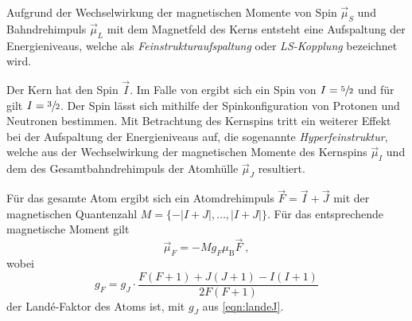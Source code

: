     Aufgrund der Wechselwirkung der magnetischen Momente von Spin $\vec{\mu}_S$ und Bahndrehimpuls $\vec{\mu}_L$ mit dem Magnetfeld des Kerns entsteht eine Aufspaltung der Energieniveaus,
    welche als \textit{Feinstrukturaufspaltung} oder \textit{LS-Kopplung} bezeichnet wird.

    Der Kern hat den Spin $\vec{I}$.
    Im Falle von  ergibt sich ein Spin von $I = \sfrac{5}{2}$ und für  gilt $I = \sfrac{3}{2}$.
    Der Spin lässt sich mithilfe der Spinkonfiguration von Protonen und Neutronen bestimmen.
    Mit Betrachtung des Kernspins tritt ein weiterer Effekt bei der Aufspaltung der Energieniveaus auf,
    die sogenannte \textit{Hyperfeinstruktur},
    welche aus der Wechselwirkung der magnetischen Momente des Kernspins $\vec{\mu}_I$ und dem des Gesamtbahndrehimpuls der Atomhülle $\vec{\mu}_J$ resultiert.

    Für das gesamte Atom ergibt sich ein Atomdrehimpuls $\vec{F} = \vec{I} + \vec{J}$ mit der magnetischen Quantenzahl $M = \{-\lvert I+J \rvert, \ldots, \lvert I+J \rvert\}$.
    Für das entsprechende magnetische Moment gilt
    \begin{equation}
        \vec{\mu}_F = - M g_F \mu_\text{B} \vec{F} \ ,
    \end{equation}
    wobei
    \begin{equation}
        g_F = g_J \cdot \frac{F(F+1) + J(J+1) - I(I+1)}{2F(F+1)}
        \label{eqn:landeF}
    \end{equation}
    der Landé-Faktor des Atoms ist,
    mit $g_J$ aus \autoref{eqn:landeJ}.

